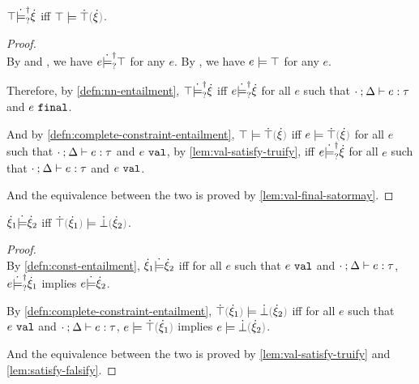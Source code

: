 \begin{theorem}
\label{thrm:demystify-exhaustiveness}
$\top \dot{\models}_{?}^{\dag} \dot{\xi}$ iff $\ccsatisfy{\ctruth}{\ctruify{\hxi}}$.
\end{theorem}
\begin{proof}\mbox{}\\

  By  and , we have $e \dot{\models}_{?}^{\dag} \top$ for any $e$.
  By , we have $e \models \top$ for any $e$.

  Therefore, by \autoref{defn:nn-entailment}, $\top \dot{\models}_{?}^{\dag} \dot{\xi}$ iff $e \dot{\models}_{?}^{\dag} \dot{\xi}$ for all $e$ such that $\cdot \mathbin{;} \Delta \vdash e : \tau$ and $e ~\mathtt{final}$.

  And by \autoref{defn:complete-constraint-entailment}, $\ccsatisfy{\ctruth}{\ctruify{\hxi}}$ 
  iff $\ccsatisfy{e}{\ctruify{\hxi}}$ for all $e$ such that $\cdot \mathbin{;} \Delta \vdash e : \tau$ and $e ~\mathtt{val}$, 
  by \autoref{lem:val-satisfy-truify}, iff $e \dot{\models}_{?}^{\dag} \dot{\xi}$ for all $e$ such that $\cdot \mathbin{;} \Delta \vdash e : \tau$ and $e ~\mathtt{val}$.
  
  And the equivalence between the two is proved by \autoref{lem:val-final-satormay}.
\end{proof}

\begin{theorem}
\label{thrm:demystify-redundancy}
$\dot{\xi}_1 \dot{\models} \dot{\xi}_2$ iff $\ccsatisfy{\ctruify{\hxi_1}}{\cfalsify{\hxi_2}}$.
\end{theorem}
\begin{proof}\mbox{}\\
  
  By \autoref{defn:const-entailment}, $\dot{\xi}_1 \dot{\models} \dot{\xi}_2$ iff for all $e$ such that $e ~\mathtt{val}$ and $\cdot \mathbin{;} \Delta \vdash e : \tau$, $e \dot{\models}_{?}^{\dag} \dot{\xi}_1$ implies $e \dot{\models} \dot{\xi}_2$.
  
  By \autoref{defn:complete-constraint-entailment}, $\ccsatisfy{\ctruify{\hxi_1}}{\cfalsify{\hxi_2}}$ iff for all $e$ such that $e ~\mathtt{val}$ and $\cdot \mathbin{;} \Delta \vdash e : \tau$, $\ccsatisfy{e}{\ctruify{\hxi_1}}$ implies $\ccsatisfy{e}{\cfalsify{\hxi_2}}$.
  
  And the equivalence between the two is proved by \autoref{lem:val-satisfy-truify} and \autoref{lem:satisfy-falsify}.
\end{proof}